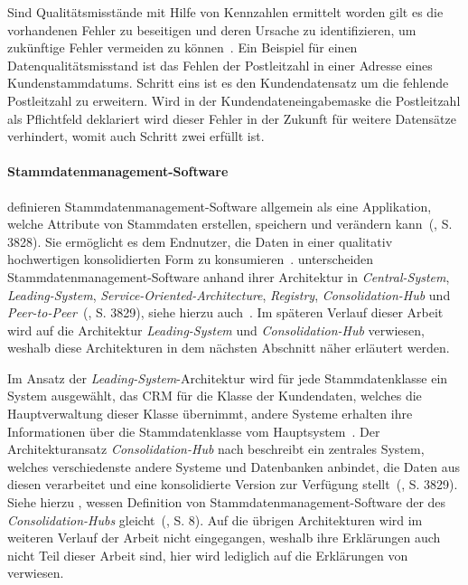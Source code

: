 \documentclass[
  language=german, %
  type=bachelor%
]{isthesis}
\begin{document}
\begin{content}
	Sind Qualitätsmisstände mit Hilfe von Kennzahlen ermittelt worden gilt es die
	vorhandenen Fehler zu beseitigen und deren Ursache zu identifizieren, um
	zukünftige Fehler vermeiden zu können~\cite[][S. 22]{eckerson2002data}. Ein
	Beispiel für einen Datenqualitätsmisstand ist das Fehlen der Postleitzahl in
	einer Adresse eines Kundenstammdatums. Schritt eins ist es den
	Kundendatensatz um die fehlende Postleitzahl zu erweitern. Wird in der
	Kundendateneingabemaske die Postleitzahl als Pflichtfeld deklariert wird
	dieser Fehler in der Zukunft für weitere Datensätze verhindert, womit auch
	Schritt zwei erfüllt ist.

	\paragraph{Stammdatenmanagement-Software}
	\textsc{\citeauthor{baghi2014toward}} definieren
	Stammdatenmanagement-Software allgemein als eine Applikation, welche
  Attribute von Stammdaten erstellen, speichern und verändern kann~(\citeyear{baghi2014toward}, S. 3828).  Sie
	ermöglicht es dem Endnutzer, die Daten in einer qualitativ hochwertigen
	konsolidierten Form zu konsumieren~\cite[][Abschnitt
	1.2.]{dreibelbis2008enterprise}.  \textsc{\citeauthor{baghi2014toward}}
	unterscheiden Stammdatenmanagement-Software anhand ihrer Architektur in
	\textit{Central-System}, \textit{Leading-System},
	\textit{Service-Oriented-Architecture}, \textit{Registry},
  \textit{Consolidation-Hub} und \textit{Peer-to-Peer}~(\citeyear{baghi2014toward}, S. 3829), siehe hierzu auch~\cite[][Abschnitt
	5.3.1.]{dreibelbis2008enterprise}. Im späteren Verlauf dieser Arbeit wird auf
	die Architektur \textit{Leading-System} und \textit{Consolidation-Hub}
	verwiesen, weshalb diese Architekturen in dem nächsten Abschnitt näher
	erläutert werden.
	
	Im Ansatz der \textit{Leading-System}-Architektur wird für jede
	Stammdatenklasse ein System ausgewählt, \zB{} das \acrshort{CRM} für die
	Klasse der Kundendaten, welches die Hauptverwaltung dieser Klasse übernimmt,
	andere Systeme erhalten ihre Informationen über die Stammdatenklasse vom
	Hauptsystem~\cite[][S. 3829]{baghi2014toward}. Der Architekturansatz
	\textit{Consolidation-Hub} nach \textsc{\citeauthor{baghi2014toward}}
	beschreibt ein zentrales System, welches verschiedenste andere Systeme und
	Datenbanken anbindet, die Daten aus diesen verarbeitet und eine konsolidierte
  Version zur Verfügung stellt~(\citeyear{baghi2014toward}, S. 3829). Siehe hierzu
	\textsc{\citeauthor{loshin2010master}}, wessen Definition von
	Stammdatenmanagement-Software der des \textit{Consolidation-Hubs}
  gleicht~(\citeyear{loshin2010master}, S. 8). Auf die übrigen Architekturen wird
	im weiteren Verlauf der Arbeit nicht eingegangen, weshalb ihre Erklärungen
	auch nicht Teil dieser Arbeit sind, hier wird lediglich auf die Erklärungen
	von~\cite{baghi2014toward} verwiesen.



\end{content}
\end{document}
